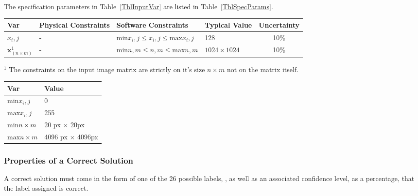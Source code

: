 \documentclass[12pt]{article}
\begin{document}
The specification parameters in Table~\ref{TblInputVar} are listed in
Table~\ref{TblSpecParams}.

\begin{table}[!h]
  \caption{Input Variables} \label{TblInputVar}
  \renewcommand{\arraystretch}{1.2}
\noindent \begin{longtable*}{l l l l c} 
  \toprule
  \textbf{Var} & \textbf{Physical Constraints} & \textbf{Software Constraints} &
                             \textbf{Typical Value} & \textbf{Uncertainty}\\
  \midrule 
  $x_i,j$& - & ${\text{min}} x_i,j \leq x_i,j \leq {\text{max}} x_i,j$ & 128 & 10\%
  \\
  $\mathbf{x}_(n \times m)^1$& - & ${\text{min}} n, m \leq n, m \leq {\text{max}} n, m$ & $1024 \times 1024$ & 10\%
  \\
  \bottomrule
\end{longtable*}
\end{table}

\noindent 
\begin{description}
\item $^1$ The constraints on the input image matrix are strictly on it's size $n \times m$ not on the matrix itself.
\end{description}

\begin{table}[!h]
\caption{Specification Parameter Values} \label{TblSpecParams}
\renewcommand{\arraystretch}{1.2}
\noindent \begin{longtable*}{l l} 
  \toprule
  \textbf{Var} & \textbf{Value} \\
  \midrule 
  $\text{min} x_i,j$ & 0\\
  $\text{max} x_i,j$ & 255\\
  $\text{min} n \times m$ & 20 px $\times$ 20px\\
  $\text{max} n \times m$ & 4096 px $\times$ 4096px\\
  \bottomrule
\end{longtable*}
\end{table}

\subsubsection{Properties of a Correct Solution} \label{sec_CorrectSolution}

\noindent
A correct solution must come in the form of one of the 26 possible labels,
, as well as an associated 
confidence level, as a percentage, that the label assigned is correct.
\end{document}
